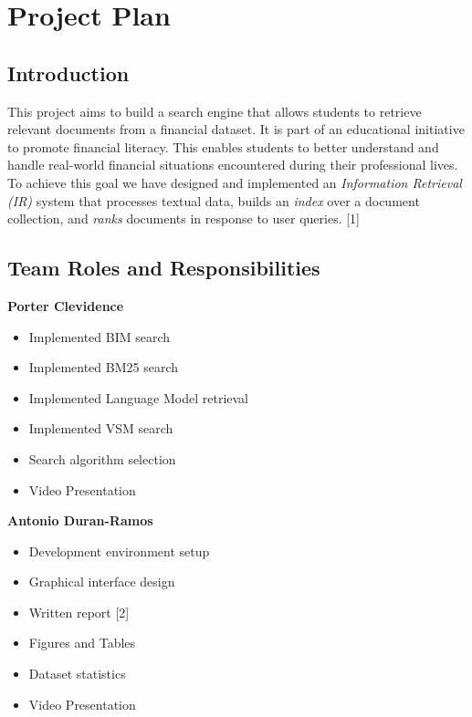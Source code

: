 \clearpage
\section*{Project Plan}
{} 

\subsection*{Introduction}
{}

This project aims to build a search engine that allows students to retrieve 
relevant documents from a financial dataset. It is part of an educational 
initiative to promote financial literacy. This enables students to better 
understand and handle real-world financial situations encountered during their 
professional lives. To achieve this goal we have designed and implemented 
an \textit{Information Retrieval (IR)} system that processes textual data, 
builds an \textit{index} over a document collection, and \textit{ranks} 
documents in response to user queries. [1]


\subsection*{Team Roles and Responsibilities }
{}

\textbf{Porter Clevidence} 
\begin{itemize}
    \item   Implemented BIM search 
    \item   Implemented BM25 search 
    \item   Implemented Language Model retrieval
    \item   Implemented VSM search 
    \item   Search algorithm selection
    \item Video Presentation
\end{itemize}

\textbf{Antonio Duran-Ramos}
\begin{itemize}
    \item   Development environment setup 
    \item   Graphical interface design 
    \item   Written report [2]
    \item   Figures and Tables
    \item   Dataset statistics
    \item Video Presentation        
\end{itemize}

